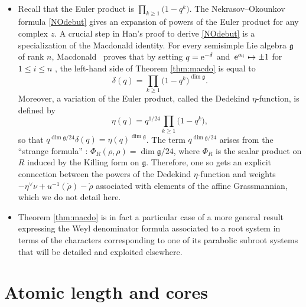 \documentclass[10pt,a4paper]{amsart}
\numberwithin{equation}{section}
\begin{document}
\begin{Remark}%
\
\begin{itemize}\itemsep=0pt
\item Recall that the Euler product is $\prod_{k\geq1} \bigl(
		1-q^{k}\bigr) $. The Nekrasov--Okounkov formula \eqref{NOdebut} gives an
		expansion of powers of the Euler product for any complex $z$. A crucial step in
		Han's proof to derive \eqref{NOdebut} is a specialization of the Macdonald
		identity. For every semisimple Lie algebra $\mathfrak{g}$ of rank $n$,
		Macdonald~\cite{Mac} proves that by setting $q={\rm e}^{-\delta}$ and~${{\rm e}^{\alpha
			_{i}}\mapsto\pm1}$ for~${1\leq i\leq n}$
		, the left-hand side of Theorem \ref{thm:macdo} is equal to
		\[
		\delta(q)=\prod_{k\geq1} \bigl( 1-q^{k}\bigr) ^{\dim\mathfrak{g}}.
		\]
		Moreover, a variation of the Euler product, called the Dedekind $\eta$-function,
		is defined by
		\[
		\eta(q)=q^{1/24}\prod_{k\geq1} \bigl( 1-q^{k}\bigr),
		\]
		so that $q^{\dim\mathfrak{g}/24}\delta(q)=\eta(q)^{\dim\mathfrak{g}}$. The
		term $q^{\dim\mathfrak{g}/24}$ arises from the ``strange formula'' \mbox{\cite[p.~243]{FVries}}:
        $\Phi_{R}(\rho,\rho)=\dim\mathfrak{g}/24$, where
		$\Phi_{R}$ is the scalar product on $R$ induced by the Killing form on
		$\mathfrak{g}$. Therefore, one so gets an explicit connection between the powers
		of the Dedekind $\eta$-function and weights $-\eta^{\vee}\nu+u^{-1}(\mathring
		{\rho})-\mathring{\rho}$ associated with elements of the affine Grassmannian,
		which we do not detail here.

\item Theorem \ref{thm:macdo} is in fact a particular case of a more general result expressing the Weyl denominator formula associated to a root system in terms of the characters corresponding to one of its parabolic subroot systems that will be detailed and exploited elsewhere.
\end{itemize}	
\end{Remark}

\section{Atomic length and cores}\label{sec:atomic}
\end{document}
